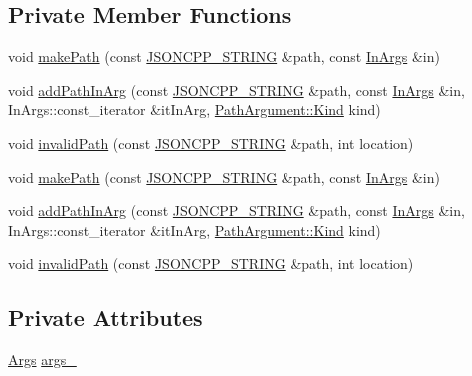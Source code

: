 \subsection*{Private Member Functions}
\begin{DoxyCompactItemize}
\item 
void \hyperlink{class_json_1_1_path_a362a420a47acb1a1f9c79173cbfef94d}{make\+Path} (const \hyperlink{config_8h_a1e723f95759de062585bc4a8fd3fa4be}{J\+S\+O\+N\+C\+P\+P\+\_\+\+S\+T\+R\+I\+NG} \&path, const \hyperlink{class_json_1_1_path_ab29d7b2fc896c7d3c5ed4609af3a3f23}{In\+Args} \&in)
\item 
void \hyperlink{class_json_1_1_path_ae65717a5fbc35b1336cbf783b15aad2e}{add\+Path\+In\+Arg} (const \hyperlink{config_8h_a1e723f95759de062585bc4a8fd3fa4be}{J\+S\+O\+N\+C\+P\+P\+\_\+\+S\+T\+R\+I\+NG} \&path, const \hyperlink{class_json_1_1_path_ab29d7b2fc896c7d3c5ed4609af3a3f23}{In\+Args} \&in, In\+Args\+::const\+\_\+iterator \&it\+In\+Arg, \hyperlink{class_json_1_1_path_argument_a2420bbad778573c147e578701b84d9b9}{Path\+Argument\+::\+Kind} kind)
\item 
void \hyperlink{class_json_1_1_path_a0fa77fc0cefefcfcf2f1242c79009dd9}{invalid\+Path} (const \hyperlink{config_8h_a1e723f95759de062585bc4a8fd3fa4be}{J\+S\+O\+N\+C\+P\+P\+\_\+\+S\+T\+R\+I\+NG} \&path, int location)
\item 
void \hyperlink{class_json_1_1_path_a362a420a47acb1a1f9c79173cbfef94d}{make\+Path} (const \hyperlink{config_8h_a1e723f95759de062585bc4a8fd3fa4be}{J\+S\+O\+N\+C\+P\+P\+\_\+\+S\+T\+R\+I\+NG} \&path, const \hyperlink{class_json_1_1_path_ab29d7b2fc896c7d3c5ed4609af3a3f23}{In\+Args} \&in)
\item 
void \hyperlink{class_json_1_1_path_ae65717a5fbc35b1336cbf783b15aad2e}{add\+Path\+In\+Arg} (const \hyperlink{config_8h_a1e723f95759de062585bc4a8fd3fa4be}{J\+S\+O\+N\+C\+P\+P\+\_\+\+S\+T\+R\+I\+NG} \&path, const \hyperlink{class_json_1_1_path_ab29d7b2fc896c7d3c5ed4609af3a3f23}{In\+Args} \&in, In\+Args\+::const\+\_\+iterator \&it\+In\+Arg, \hyperlink{class_json_1_1_path_argument_a2420bbad778573c147e578701b84d9b9}{Path\+Argument\+::\+Kind} kind)
\item 
void \hyperlink{class_json_1_1_path_a0fa77fc0cefefcfcf2f1242c79009dd9}{invalid\+Path} (const \hyperlink{config_8h_a1e723f95759de062585bc4a8fd3fa4be}{J\+S\+O\+N\+C\+P\+P\+\_\+\+S\+T\+R\+I\+NG} \&path, int location)
\end{DoxyCompactItemize}
\subsection*{Private Attributes}
\begin{DoxyCompactItemize}
\item 
\hyperlink{class_json_1_1_path_a27d96232d034d7a78286468676f9cb3e}{Args} \hyperlink{class_json_1_1_path_af33d0de7ee9f99d3e361bdf504dc2bc7}{args\+\_\+}
\end{DoxyCompactItemize}


